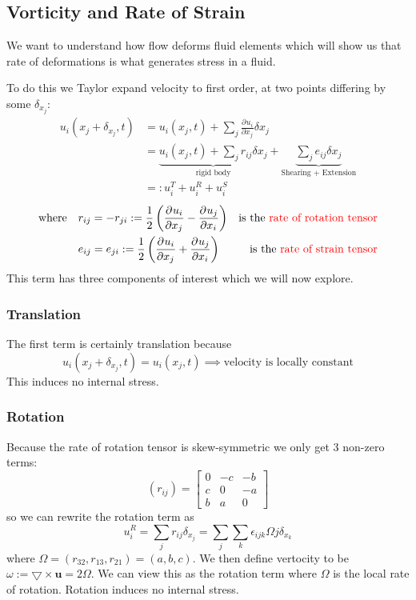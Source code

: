\documentclass[11pt]{article}
\newcommand*{\pd}[3][]{\ensuremath{\frac{\partial^{#1} {#2}}{\partial {#3}^{#1}}}}
\newcommand{\grad}{\bigtriangledown}
\newcommand{\defeq}{:=}
\newcommand{\eqdef}{=:}
\newcommand{\mv}[1]{\bm{#1}}
\newcommand{\mdf}[1]{{\color{red}#1}}
\begin{document}
\subsection{Vorticity and Rate of Strain}
We want to understand how flow deforms fluid elements which will show us that rate of deformations is what generates stress in a fluid.

To do this we Taylor expand velocity to first order, at two points differing by some $\delta_{x_j}:$
\begin{align*}
    u_i(x_j+\delta_{x_j},t)&=u_i(x_j,t)+\sum_j \pd{u_i}{x_j}\delta{x_j}\\
    &=\underbrace{u_i(x_j,t)+\sum_j r_{ij}\delta{x_j}}_{\text{rigid body}}+\underbrace{\sum_j e_{ij}\delta{x_j}}_{\text{Shearing + Extension}}\\
    &\eqdef u_i^T + u_i^R + u_i^S
\end{align*}
\begin{align*}
    \text{where} \quad &r_{ij}=-r_{ji}\defeq\frac{1}{2}\left(\pd{u_i}{x_j}-\pd{u_j}{x_i}\right) & \text{is the \mdf{rate of rotation tensor}}\\
    \quad &e_{ij}=e_{ji}\defeq\frac{1}{2}\left(\pd{u_i}{x_j}+\pd{u_j}{x_i}\right) & \text{is the \mdf{rate of strain tensor}}
\end{align*}
This term has three components of interest which we will now explore.
\subsubsection{Translation}
The first term is certainly translation because
$$u_i(x_j+\delta_{x_j},t)=u_i(x_j,t)\implies\text{velocity is locally constant}$$
This induces no internal stress.
\subsubsection{Rotation}
Because the rate of rotation tensor is skew-symmetric we only get 3 non-zero terms:
\[
(r_{ij})=
\begin{bmatrix}
0 & -c & -b\\
c &  0 & -a\\
b &  a &  0
\end{bmatrix}
\]
so we can rewrite the rotation term as
$$u_i^R=\sum_j r_{ij}\delta_{x_j} = \sum_j \sum_k \epsilon_{ijk}\Omega{j}\delta_{x_k}$$
where $\Omega = (r_{32},r_{13},r_{21})=(a,b,c)$.
We then define \mdf{vertocity} to be $\omega\defeq\grad\times\mv{u}=2\Omega$.
We can view this as the rotation term where $\Omega$ is the local rate of rotation. Rotation induces no internal stress.
\end{document}
